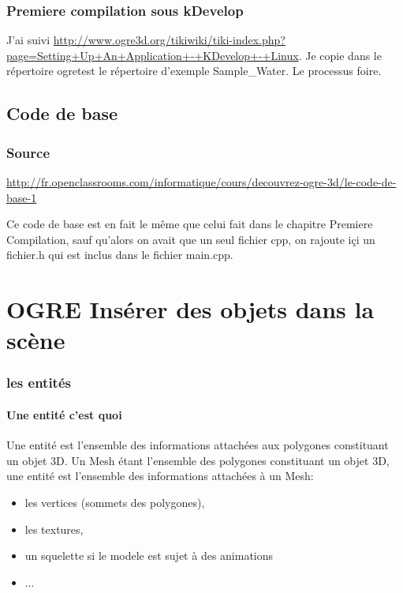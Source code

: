 \documentclass[10pt,a4paper]{report}
\begin{document}
\section{Premiere compilation sous kDevelop}
J'ai suivi\newline
\url{http://www.ogre3d.org/tikiwiki/tiki-index.php?page=Setting+Up+An+Application+-+KDevelop+-+Linux}.\newline
Je copie dans le r\'epertoire ogretest le r\'epertoire d'exemple Sample\_Water. Le processus foire.




\chapter{Code de base}
\section{Source}
\url{http://fr.openclassrooms.com/informatique/cours/decouvrez-ogre-3d/le-code-de-base-1}

Ce code de base est en fait le m\^eme que celui fait dans le chapitre Premiere Compilation, sauf qu'alors on avait que un seul fichier cpp, on rajoute i\c{c}i un fichier.h qui est inclus dans le fichier main.cpp.



\part{OGRE \newline Ins\'erer des objets dans la sc\`ene }

\section{les entit\'es}

\subsection{Une entit\'e c'est quoi}
Une entit\'e est l'ensemble des informations attach\'ees aux polygones constituant un objet 3D.\newline
Un Mesh \'etant l'ensemble des polygones constituant un objet 3D, une entit\'e est l'ensemble des informations attach\'ees \`{a} un Mesh:

\begin{itemize}
\item les vertices (sommets des polygones),
\item les textures,
\item un squelette si le modele est sujet \`{a} des animations
\item...\newline
\end{itemize}
\end{document}
